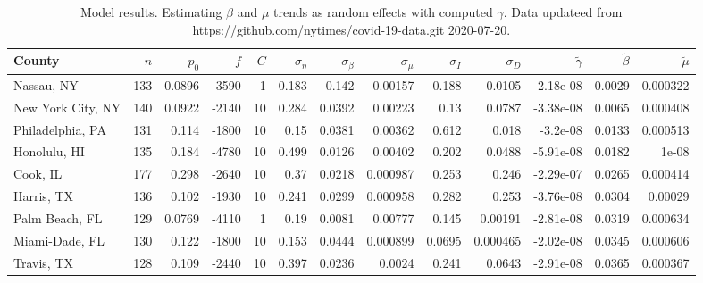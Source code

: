 \documentclass[12pt,letterpaper]{article}
\begin{document}
\begin{sidewaystable}
\caption{\label{tab:sumres}
Model results.
Estimating $\beta$ and $\mu$ trends as random effects with computed $\gamma$.
Data updateed from https://github.com/nytimes/covid-19-data.git
2020-07-20.
}
\centering
{\small

\begin{tabular}{lrrrrrrrrrrrr}
\hline
 County            &   $n$ &   $p_0$ &   $f$ &   $C$ &   $\sigma_\eta$ &   $\sigma_\beta$ &   $\sigma_\mu$ &   $\sigma_I$ &   $\sigma_D$ &   $\tilde\gamma$ &   $\tilde{\beta}$ &   $\tilde{\mu}$ \\
\hline
 Nassau, NY        &   133 &  0.0896 & -3590 &     1 &           0.183 &           0.142  &       0.00157  &       0.188  &     0.0105   &        -2.18e-08 &            0.0029 &        0.000322 \\
 New York City, NY &   140 &  0.0922 & -2140 &    10 &           0.284 &           0.0392 &       0.00223  &       0.13   &     0.0787   &        -3.38e-08 &            0.0065 &        0.000408 \\
 Philadelphia, PA  &   131 &  0.114  & -1800 &    10 &           0.15  &           0.0381 &       0.00362  &       0.612  &     0.018    &        -3.2e-08  &            0.0133 &        0.000513 \\
 Honolulu, HI      &   135 &  0.184  & -4780 &    10 &           0.499 &           0.0126 &       0.00402  &       0.202  &     0.0488   &        -5.91e-08 &            0.0182 &        1e-08    \\
 Cook, IL          &   177 &  0.298  & -2640 &    10 &           0.37  &           0.0218 &       0.000987 &       0.253  &     0.246    &        -2.29e-07 &            0.0265 &        0.000414 \\
 Harris, TX        &   136 &  0.102  & -1930 &    10 &           0.241 &           0.0299 &       0.000958 &       0.282  &     0.253    &        -3.76e-08 &            0.0304 &        0.00029  \\
 Palm Beach, FL    &   129 &  0.0769 & -4110 &     1 &           0.19  &           0.0081 &       0.00777  &       0.145  &     0.00191  &        -2.81e-08 &            0.0319 &        0.000634 \\
 Miami-Dade, FL    &   130 &  0.122  & -1800 &    10 &           0.153 &           0.0444 &       0.000899 &       0.0695 &     0.000465 &        -2.02e-08 &            0.0345 &        0.000606 \\
 Travis, TX        &   128 &  0.109  & -2440 &    10 &           0.397 &           0.0236 &       0.0024   &       0.241  &     0.0643   &        -2.91e-08 &            0.0365 &        0.000367 \\

\end{tabular}}
\end{sidewaystable}
\end{document}
